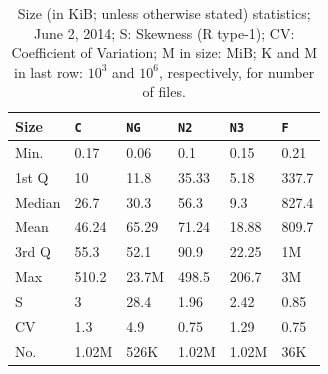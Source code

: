 \begin{table}[!ht]

\caption{Size (in KiB; unless otherwise stated) statistics; June 2, 2014; S: Skewness (R type-1); CV: Coefficient of Variation; M in size: MiB; K and M in last row: $10^3$ and $10^6$, respectively, for number of files.}
\label{tab:size-summary}
\begin{center}
    \begin{tabular}{|l|l|l|l|l|l|}     \hline
    \textbf{Size} & \textbf{\texttt{C}} &  \textbf{\texttt{NG}}  & \textbf{\texttt{N2}} & \textbf{\texttt{N3}} & \textbf{\texttt{F}}\\ \hline
    Min.                             & 0.17          & 0.06  		 & 0.1  		 & 0.15 		 & 0.21\\ \hline
    1st Q		        	      & 10       & 11.8 		& 35.33   		 & 5.18		 & 337.7\\ \hline
    Median                        & 26.7        & 30.3		& 56.3     	 & 9.3		 & 827.4\\ \hline
    Mean                           & 46.24        & 65.29 		& 71.24     	 & 18.88		 & 809.7\\ \hline
    3rd Q		               & 55.3        & 52.1		& 90.9  		 & 22.25		 & 1M\\ \hline
    Max                             & 510.2      & 23.7M    	& 498.5  	 & 206.7		 & 3M\\ \hline
    S		      & 3		 & 28.4	  	& 1.96	   	& 2.42		& 0.85\\ \hline
    CV			      & 1.3		  & 4.9	    	& 0.75	 	& 1.29		 & 0.75\\ \hline
    No.		      & 1.02M   &  526K 	& 1.02M   	& 1.02M	& 36K\\ \hline
\end{tabular}
\end{center}
\end{table}

